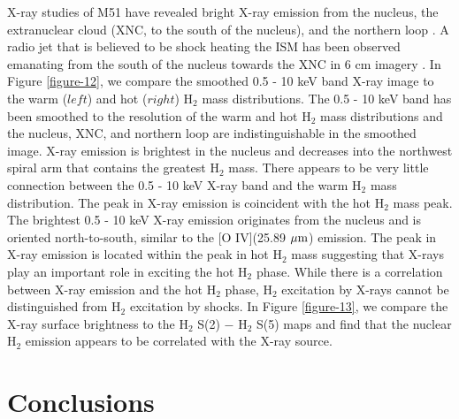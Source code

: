 \documentclass[manuscript]{aastex}
\begin{document}
X-ray studies of M51 have revealed bright X-ray emission from 
the nucleus, the extranuclear cloud (XNC, to the south of the nucleus), 
and the northern loop \citep{wil01}.  A radio jet that is believed to be shock heating 
the ISM has been observed emanating from the south of the nucleus 
towards the XNC in 6 cm imagery \citep{cra92}.  In Figure \ref{figure-12}, 
we compare the smoothed 0.5 - 10 keV band X-ray
image to the warm ($left$) and hot ($right$) $\mathrm{H_2}$ mass
distributions.  The 0.5 - 10 keV band has been smoothed to the
resolution of the warm and hot $\mathrm{H_2}$ mass distributions and
the nucleus, XNC, and northern loop are indistinguishable in the
smoothed image.  X-ray emission is brightest in the nucleus and
decreases into the northwest spiral arm that contains the greatest
$\mathrm{H_2}$ mass.  There appears to be very little connection
between the 0.5 - 10 keV X-ray band and the warm $\mathrm{H_2}$ mass
distribution.  The peak in X-ray emission is coincident with the hot $\mathrm{H_2}$
mass peak. The brightest 0.5 - 10 keV X-ray emission originates
from the nucleus and is oriented north-to-south, similar to the [O
  IV](25.89 $\mbox{$\mu$m}$) emission.  The peak in X-ray emission is
located within the peak in hot $\mathrm{H_2}$ mass suggesting that
X-rays play an important role in exciting the hot $\mathrm{H_2}$
phase.  While there is a correlation between X-ray emission and the
hot $\mathrm{H_2}$ phase, $\mathrm{H_2}$ excitation by X-rays cannot
be distinguished from $\mathrm{H_2}$ excitation by shocks. In Figure 
\ref{figure-13}, we compare the X-ray surface brightness to the H$_2$ S(2) $-$ 
H$_2$ S(5) maps and find that the nuclear $\mathrm{H_2}$ emission 
appears to be correlated with the X-ray source.

\section{Conclusions}
\end{document}
